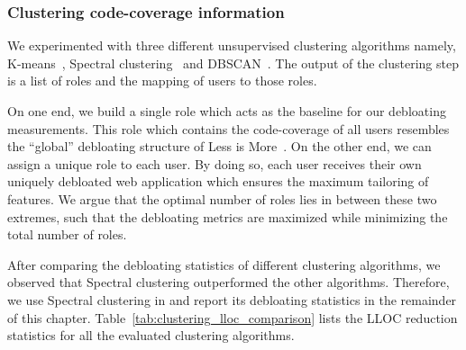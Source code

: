 \subsubsection{Clustering code-coverage information} We experimented with three different unsupervised clustering algorithms namely, K-means~\cite{Jin2010}, Spectral clustering~\cite{spectralclustering} and DBSCAN~\cite{dbscan}.
The output of the clustering step is a list of roles and the mapping of users to those roles.  

On one end, we build a single role which acts as the baseline for our debloating measurements. 
This role which contains the code-coverage of all users resembles the ``global'' debloating structure of Less is More~\cite{lessismore}. 
On the other end, we can assign a unique role to each user. 
By doing so, each user receives their own uniquely debloated web application which ensures the maximum tailoring of features. 
We argue that the optimal number of roles lies in between these two extremes, such that the debloating metrics are maximized while minimizing the total number of roles. 


After comparing the debloating statistics of different clustering algorithms, we observed that Spectral clustering outperformed the other algorithms. Therefore, we use Spectral clustering in \dbltr{} and report its debloating statistics in the remainder of this chapter. 
Table~\ref{tab:clustering_lloc_comparison} lists the LLOC reduction statistics for all the evaluated clustering algorithms.

